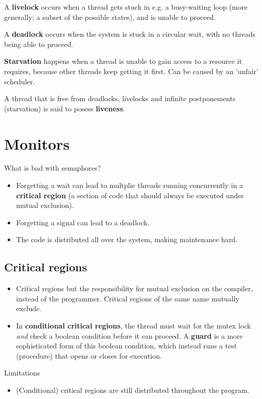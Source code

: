 A \textbf{livelock} occurs when a thread gets stuck in e.g. a busy-waiting loop (more generally; a subset of the possible states), and is unable to proceed.

A \textbf{deadlock} occurs when the system is stuck in a circular wait, with no threads being able to proceed. 

\textbf{Starvation} happens when a thread is unable to gain access to a resource it requires, because other threads keep getting it first. Can be caused by an 'unfair' scheduler.

A thread that is free from deadlocks, livelocks and infinite postponements (starvation) is said to posess \textbf{liveness}.

\section{Monitors}
What is bad with semaphores?
\begin{itemize}
    \item Forgetting a wait can lead to multplie threads running concurrently in a \textbf{critical region} (a section of code that should always be executed under mutual exclusion).
    \item Forgetting a signal can lead to a deadlock.
    \item The code is distributed all over the system, making maintenance hard.
\end{itemize}

\subsection{Critical regions}
\begin{itemize}
    \item Critical regions but the responsibility for mutual exclusion on the compiler, instead of the programmer. Critical regions of the same name mutually exclude.
    \item In \textbf{conditional critical regions}, the thread must wait for the mutex lock \emph{and} check a boolean condition before it can proceed. A \textbf{guard} is a more sophisticated form of this boolean condition, which instead runs a test (procedure) that opens or closes for execution.
\end{itemize}
Limitations
\begin{itemize}
    \item (Conditional) critical regions are still distributed throughout the program.
\end{itemize}

